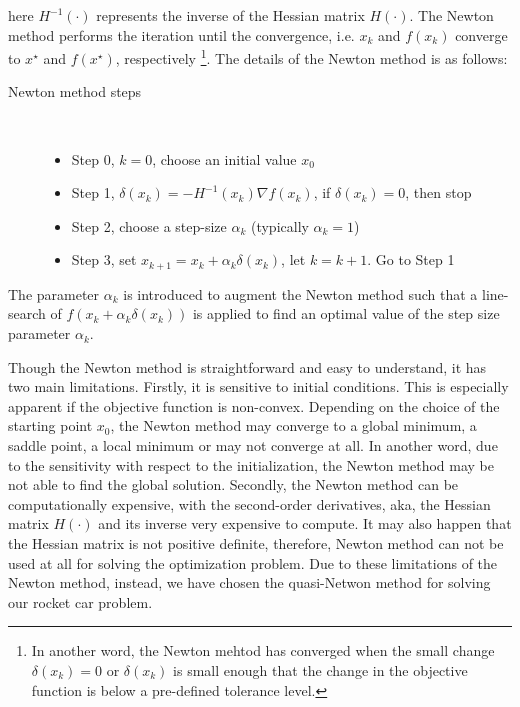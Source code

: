 \documentclass  [
  paper    = a4,
  BCOR     = 10mm,
  twoside,
  fontsize = 12pt,
  fleqn,
  toc      = bibnumbered,
  toc      = listofnumbered,
  numbers  = noendperiod,
  headings = normal,
  listof   = leveldown,
  version  = 3.03
]                                       {scrreprt}
\newcommand{\<}{\langle}
\renewcommand{\>}{\rangle}
\begin{document}
   here $ H^{-1}(\cdot)$ represents the inverse of the Hessian matrix $H(\cdot)$. The Newton method performs the iteration until the convergence, i.e. $x_k$ and $f(x_k)$ converge to $x^\star$ and $f(x^\star)$, respectively \footnote{In another word, the Newton mehtod has converged when the small change $\delta(x_k) =0$ or $\delta(x_k)$ is small enough that the change in the objective function is below a pre-defined tolerance level.}. The details of the Newton method is as follows: 
   \begin{description}
   	\item[Newton method steps]\ 
   	\begin{itemize}
   		\item Step 0, $k=0$, choose an initial value $x_0$ 
   		\item Step 1, $\delta(x_k)  =- H^{-1}(x_k)\nabla f(x_k)$, if $\delta(x_k) =0$, then stop
   		\item Step 2, choose a step-size $\alpha_k$ (typically $\alpha_k =1$)
   		\item Step 3, set $x_{k+1}  = x_k + \alpha_k \delta(x_k) $, let $k= k+1$. Go to Step 1
   	\end{itemize}
   \end{description}
   
   The parameter $\alpha_k$ is introduced to augment the Newton method such that a line-search of $f(x_k + \alpha_k \delta(x_k))$ is applied to find an optimal value of the step size parameter $\alpha_k$. 
   
   Though the Newton method is straightforward and easy to understand, it has two main limitations. Firstly, it is sensitive to initial conditions. This is especially apparent if the objective function is non-convex. Depending on the choice of the starting point $x_0$, the Newton method may converge to a global minimum, a saddle point, a local minimum or may not converge at all. In another word, due to the sensitivity with respect to the initialization, the Newton method may be not able to find the global solution. Secondly, the Newton method can be computationally expensive, with the second-order derivatives, aka, the Hessian matrix $H(\cdot)$ and its inverse very expensive to compute. It may also happen that the Hessian matrix is not positive definite, therefore, Newton method can not be used at all for solving the optimization problem. Due to these limitations of the Newton method, instead, we have chosen the quasi-Netwon method for solving our rocket car problem. 
   
\end{document}
